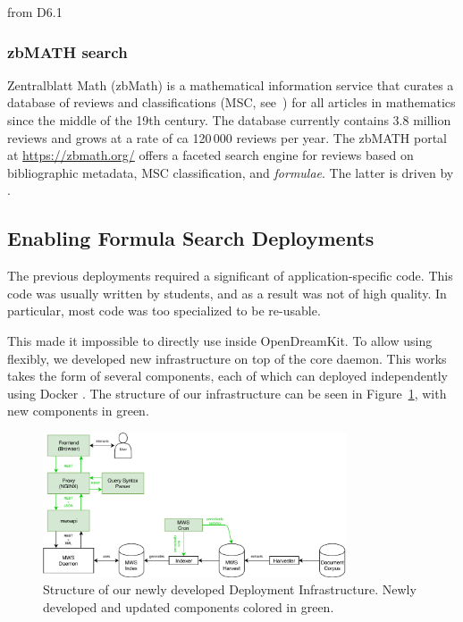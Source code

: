 \begin{newpart}{from D6.1}
\subsubsection{zbMATH search}

Zentralblatt Math (zbMath) is a mathematical information service that curates a database of reviews and classifications (MSC, see~\cite{MSC2010}) for all articles in mathematics since the middle of the 19th century. The database currently contains 3.8 million reviews and grows at a rate of ca 120\,000 reviews per year.
The zbMATH portal at \url{https://zbmath.org/} offers a faceted search engine for reviews based on bibliographic metadata, MSC classification, and \emph{formulae}.
The latter is driven by \MWS. 

\end{newpart}

\subsection{Enabling Formula Search Deployments}\label{sec:software:deployment}

The previous \MWS deployments required a significant of application-specific code. 
This code was usually written by students, and as a result was not of high quality. 
In particular, most code was too specialized to be re-usable. 

This made it impossible to directly use \MWS inside OpenDreamKit. 
To allow using \MWS flexibly, we developed new infrastructure on top of the core \MWS daemon. 
This works takes the form of several components, each of which can deployed independently using Docker .
The structure of our infrastructure can be seen in Figure~\ref{fig:mwsdeployment}, with new components in green. 

\begin{figure}[ht]
  \includegraphics[width=0.8\textwidth]{mws_layout.pdf}
  \caption{Structure of our newly developed \MWS Deployment Infrastructure. Newly developed and updated components colored in green. }\label{fig:mwsdeployment}
\end{figure}

